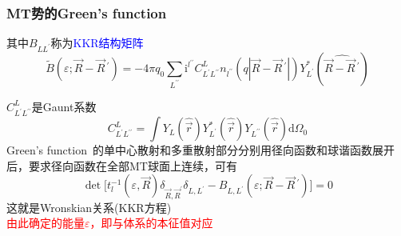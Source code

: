 \documentclass[cjk,slidestop,compress,mathserif,blue]{beamer}
\begin{document}
\frame
{
	\frametitle{\textrm{MT}势的\textrm{Green's function}}
	其中$B_{LL^{\prime}}$称为\textcolor{blue}{\textrm{KKR}结构矩阵}
	\begin{displaymath}
		\tilde B(\varepsilon;\vec R-\vec R\,^{\prime})=%
		-4\pi q_0\sum_{L^{\prime\prime}}\mathrm{i}^{l^{\prime\prime}}C_{L^{\prime}L^{\prime\prime}}^Ln_{l^{\prime\prime}}(q|\vec R-\vec R\,^{\prime}|)Y_{L^{\prime}}^{\ast}(\widehat{\vec R-\vec R\,^{\prime}})
	\end{displaymath}

	$C_{L^{\prime}L^{\prime\prime}}^L$是\textrm{Gaunt}系数
	\begin{displaymath}
		C_{L^{\prime}L^{\prime\prime}}^L=\int Y_L(\hat{\vec r})Y_{L^{\prime}}^{\ast}(\hat{\vec r})Y_{L^{\prime\prime}}(\hat{\vec r})\mathrm{d}\Omega_0
	\end{displaymath}
	\textrm{Green's function~}的单中心散射和多重散射部分分别用径向函数和球谐函数展开后，要求径向函数在全部\textrm{MT}球面上连续，可有
	\begin{displaymath}
		\det\big[t_l^{-1}(\varepsilon,\vec R)\delta_{\vec R,\vec R^{\prime}}\delta_{L,L^{\prime}}-B_{L,L^{\prime}}(\varepsilon;\vec R-\vec R\,^{\prime})\big]=0
	\end{displaymath}
	这就是\textrm{Wronskian}关系(\textrm{KKR}方程)\\
	\textcolor{red}{由此确定的能量$\varepsilon$，即与体系的本征值对应}
}
\end{document}

